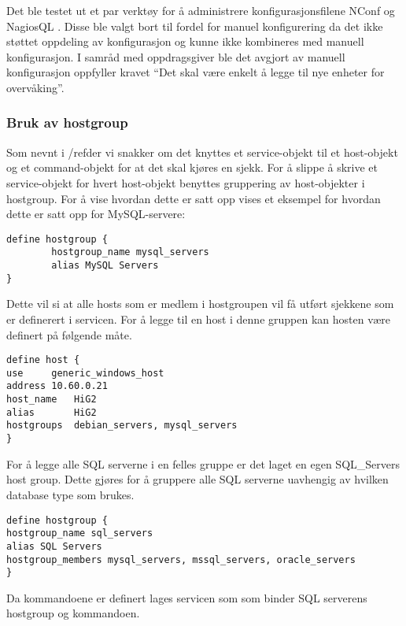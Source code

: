 Det ble testet ut et par verktøy for å administrere konfigurasjonsfilene NConf \cite{nconf} og NagiosQL \cite{nagiosql}. Disse ble valgt bort til fordel for manuel konfigurering da det ikke støttet oppdeling av konfigurasjon og kunne ikke kombineres med manuell konfigurasjon. I samråd med oppdragsgiver ble det avgjort av manuell konfigurasjon oppfyller kravet “Det skal være enkelt å legge til nye enheter for overvåking”.

\subsubsection{Bruk av hostgroup}
Som nevnt i /ref{der vi snakker om det} knyttes et service-objekt til et host-objekt og et command-objekt for at det skal kjøres en sjekk. For å slippe å skrive et service-objekt for hvert host-objekt benyttes gruppering av host-objekter i hostgroup. For å vise hvordan dette er satt opp vises et eksempel for hvordan dette er satt opp for MySQL-servere:

\begin{lstlisting}
define hostgroup {
        hostgroup_name mysql_servers
        alias MySQL Servers
}
\end{lstlisting}
Dette vil si at alle hosts som er medlem i hostgroupen vil få utført sjekkene som er definerert i servicen. For å legge til en host i denne gruppen kan hosten være definert på følgende måte.

\begin{lstlisting}
define host {
use		generic_windows_host
address	10.60.0.21
host_name	HiG2
alias		HiG2
hostgroups	debian_servers, mysql_servers
}
\end{lstlisting}
For å legge alle SQL serverne i en felles gruppe er det laget en egen SQL\_Servers host group. Dette gjøres for å gruppere alle SQL serverne uavhengig av hvilken database type som brukes. 

\begin{lstlisting}
define hostgroup {
hostgroup_name sql_servers
alias SQL Servers
hostgroup_members mysql_servers, mssql_servers, oracle_servers
}
\end{lstlisting}
Da kommandoene er definert lages servicen som som binder SQL serverens hostgroup og kommandoen.

